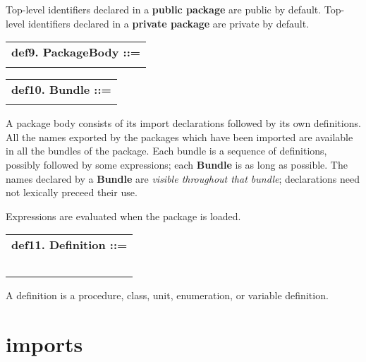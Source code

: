 \documentclass{report}
\begin{document}
Top-level identifiers declared in a {\bf public package} are public by default.
Top-level identifiers declared in a {\bf private package} are private by default.

\begin{tabular}{l}
{\bf def9. PackageBody ::= }\\ 
\hspace*{3mm}{\tt Import** SEMI Bundle** SEMI} \\ 
\end{tabular}



\begin{tabular}{l}
{\bf def10. Bundle ::= }\\ 
\hspace*{3mm}{\tt Definition+ Expr*} \\ 
\end{tabular}



A package body consists of its import declarations followed by its own
definitions. All the names exported by the packages which have been imported
are available in all the bundles of the package. Each bundle is a sequence
of definitions, possibly followed by some expressions; each {\bf Bundle} is as
long as possible. The names declared by a {\bf Bundle} are {\em visible throughout
that bundle}; declarations need not lexically preceed their use.

Expressions are evaluated when the package is loaded.

\begin{tabular}{l}
{\bf def11. Definition ::= }\\ 
\hspace*{3mm}{\tt ProcedureDef} \\ 
\hspace*{3mm}{\tt  $\mid$ VarDef} \\ 
\hspace*{3mm}{\tt  $\mid$ ClassDef} \\ 
\hspace*{3mm}{\tt  $\mid$ UnitDef} \\ 
\hspace*{3mm}{\tt  $\mid$ EnumDef} \\ 
\end{tabular}



A definition is a procedure, class, unit, enumeration, or
variable definition.

\section{imports}
\end{document}
